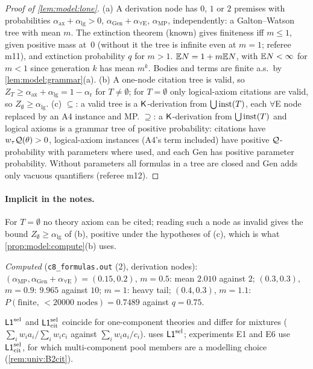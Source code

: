 \begin{proof}[Proof of \cref{lem:model:lone}]
(a) A derivation node has $0$, $1$ or $2$ premises with probabilities $\alpha_{\mathrm{ax}}+\alpha_{\mathrm{lg}}>0$, $\alpha_{\mathrm{Gen}}+\alpha_{\forall\mathrm E}$, $\alpha_{\mathrm{MP}}$, independently: a Galton--Watson tree with mean $m$. The extinction theorem (known) gives finiteness iff $m\le1$, given positive mass at~0 (without it the tree is infinite even at $m=1$; referee m11), and extinction probability $q$ for $m>1$. $\mathbb{E} N=1+m\mathbb{E} N$, with $\mathbb{E} N<\infty$ for $m<1$ since generation $k$ has mean $m^k$. Bodies and terms are finite a.s.\ by \cref{lem:model:grammar}(a).
(b) A one-node citation tree is valid, so $Z_T\ge\alpha_{\mathrm{ax}}+\alpha_{\mathrm{lg}}=1-\alpha_{\mathrm r}$ for $T\ne\emptyset$; for $T=\emptyset$ only logical-axiom citations are valid, so $Z_\emptyset\ge\alpha_{\mathrm{lg}}$.
(c) $\subseteq$: a valid tree is a $\mathsf{K}$-derivation from $\bigcup\mathrm{inst}(T)$, each $\forall$E node replaced by an A4 instance and MP. $\supseteq$: a $\mathsf{K}$-derivation from $\bigcup\mathrm{inst}(T)$ and logical axioms is a grammar tree of positive probability: citations have $w_\tau\mathcal{Q}(\theta)>0$, logical-axiom instances (A4's term included) have positive $\mathcal{Q}$-probability with parameters where used, and each Gen has positive parameter probability. Without parameters all formulas in a tree are closed and Gen adds only vacuous quantifiers (referee m12).
\end{proof}

\paragraph{Implicit in the notes.} For $T=\emptyset$ no theory axiom can be cited; reading such a node as invalid gives the bound $Z_\emptyset\ge\alpha_{\mathrm{lg}}$ of (b), positive under the hypotheses of (c), which is what \cref{prop:model:compute}(b) uses.

\emph{Computed} (\texttt{c8\_formulas.out} (2), derivation nodes): $(\alpha_{\mathrm{MP}},\alpha_{\mathrm{Gen}}+\alpha_{\forall\mathrm E})=(0.15,0.2)$, $m=0.5$: mean $2.010$ against $2$; $(0.3,0.3)$, $m=0.9$: $9.965$ against $10$; $m=1$: heavy tail; $(0.4,0.3)$, $m=1.1$: $P(\text{finite, }<20000\text{ nodes})=0.7489$ against $q=0.75$.

\begin{remark}\label{rem:model:sel}
$\mathord{\mathsf{L1}}^{\mathrm{sel}}$ and $\mathord{\mathsf{L1}}^{\mathrm{sel}}_{\mathrm{cit}}$ coincide for one-component theories and differ for mixtures ($\sum_iw_ia_i/\sum_iw_ic_i$ against $\sum_iw_ia_i/c_i$).  uses $\mathord{\mathsf{L1}}^{\mathrm{sel}}$; experiments E1 and E6 use $\mathord{\mathsf{L1}}^{\mathrm{sel}}_{\mathrm{cit}}$, for which multi-component pool members are a modelling choice (\cref{rem:univ:B2cit}).
\end{remark}

